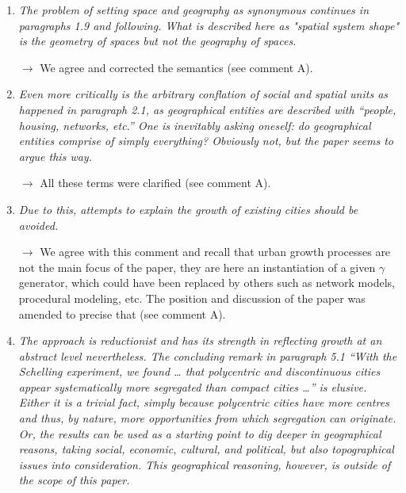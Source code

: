 \documentclass[11pt,a4paper,sans]{moderncv}        %
\begin{document}
\begin{enumerate}
  \medskip

  \item \textit{The problem of setting space and geography as synonymous continues in paragraphs 1.9 and following. What is described here as "spatial system shape" is the geometry of spaces but not the geography of spaces.}

  $\rightarrow$ We agree and corrected the semantics (see comment A). 

  \medskip

  \item \textit{Even more critically is the arbitrary conflation of social and spatial units as happened in paragraph 2.1, as geographical entities are described with “people, housing, networks, etc.” One is inevitably asking oneself: do geographical entities comprise of simply everything? Obviously not, but the paper seems to argue this way.}
  
  $\rightarrow$ All these terms were clarified (see comment A). 

  \medskip

  \item \textit{Due to this, attempts to explain the growth of existing cities should be avoided.}
  
  $\rightarrow$ We agree with this comment and recall that urban growth processes are not the main focus of the paper, they are here an instantiation of a given $\gamma$ generator, which could have been replaced by others such as network models, procedural modeling, etc. The position and discussion of the paper was amended to precise that (see comment A).

 
  \medskip
 
 
  \item \textit{The approach is reductionist and has its strength in reflecting growth at an abstract level nevertheless. The concluding remark in paragraph 5.1 “With the Schelling experiment, we found … that polycentric and discontinuous cities appear systematically more segregated than compact cities …” is elusive. Either it is a trivial fact, simply because polycentric cities have more centres and thus, by nature, more opportunities from which segregation can originate. Or, the results can be used as a starting point to dig deeper in geographical reasons, taking social, economic, cultural, and political, but also topographical issues into consideration. This geographical reasoning, however, is outside of the scope of this paper. }
  

\end{enumerate}
\end{document}
